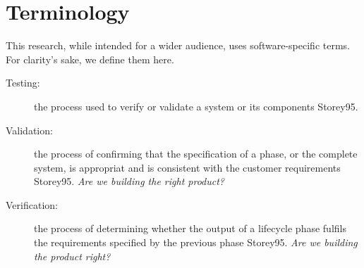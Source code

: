 \chapter{Terminology}
This research, while intended for a wider audience, uses software-specific
terms. For clarity's sake, we define them here.

\begin{description}

\item[Testing:] the process used to verify or validate a system or its 
components \cite{refs}{Storey95}.

\item[Validation:] the process of confirming that the specification of a phase,
or the complete system, is appropriat and is consistent with the customer
requirements \cite{refs}{Storey95}. \textit{Are we building the right product?}

\item[Verification:] the process of determining whether the output of a
lifecycle phase fulfils the requirements specified by the previous phase
\cite{refs}{Storey95}. \textit{Are we building the product right?}


\end{description}
